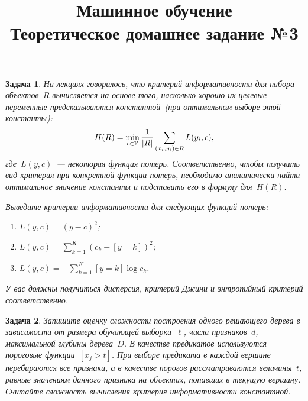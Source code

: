 \documentclass[12pt,fleqn]{article}
\newtheorem{esProblem}{Задача}
\begin{document}
\title{Машинное обучение\\Теоретическое домашнее задание №3}
\date{}
\author{}
\maketitle

\begin{esProblem}
    На лекциях говорилось, что критерий информативности для набора объектов~$R$ вычисляется на основе того,
    насколько хорошо их целевые переменные предсказываются константой~(при оптимальном выборе этой константы):
    \[
        H(R)
        =
        \min_{c \in \mathbb{Y}}
        \frac{1}{|R|}
        \sum_{(x_i, y_i) \in R}
            L(y_i, c),
    \]
    где~$L(y, c)$~--- некоторая функция потерь.
    Соответственно, чтобы получить вид критерия при конкретной функции потерь, необходимо аналитически
    найти оптимальное значение константы и подставить его в формулу для~$H(R)$.

    Выведите критерии информативности для следующих функций потерь:
    \begin{enumerate}
        \item $L(y, c) = (y - c)^2$;
        \item $L(y, c) = \sum_{k = 1}^{K} (c_k - [y = k])^2$;
        \item $L(y, c) = -\sum_{k = 1}^{K} [y = k] \log c_k$.
    \end{enumerate}
    У вас должны получиться дисперсия, критерий Джини и энтропийный критерий соответственно.
\end{esProblem}

\begin{esProblem}
    Запишите оценку сложности построения одного решающего дерева в зависимости
    от размера обучающей выборки~$\ell$, числа признаков~$d$, максимальной глубины дерева~$D$.
    В качестве предикатов используются пороговые функции~$[x_j > t]$.
    При выборе предиката в каждой вершине перебираются все признаки,
    а в качестве порогов рассматриваются величины~$t$, равные значениям данного признака
    на объектах, попавших в текущую вершину.
    Считайте сложность вычисления критерия информативности константной.
\end{esProblem}
\end{document}
